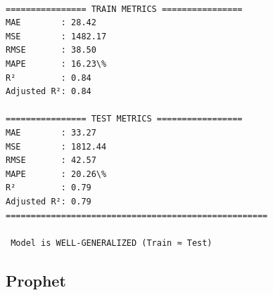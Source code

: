 \documentclass[11pt]{article}
\begin{document}
    \begin{Verbatim}[commandchars=\\\{\}]

================ TRAIN METRICS ================
MAE        : 28.42
MSE        : 1482.17
RMSE       : 38.50
MAPE       : 16.23\%
R²         : 0.84
Adjusted R²: 0.84

================ TEST METRICS =================
MAE        : 33.27
MSE        : 1812.44
RMSE       : 42.57
MAPE       : 20.26\%
R²         : 0.79
Adjusted R²: 0.79
====================================================

 Model is WELL-GENERALIZED (Train ≈ Test)
    \end{Verbatim}

    \hypertarget{prophet}{%
\subsection{Prophet}\label{prophet}}
\end{document}
